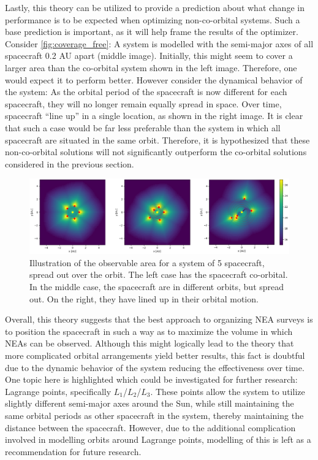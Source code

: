 Lastly, this theory can be utilized to provide a prediction about what change in performance is to be expected when optimizing non-co-orbital systems. Such a base prediction is important, as it will help frame the results of the optimizer.  Consider \autoref{fig:coverage_free}: A system is modelled with the semi-major axes of all spacecraft 0.2 AU apart (middle image). Initially, this might seem to cover a larger area than the co-orbital system shown in the left image. Therefore, one would expect it to perform better. However consider the dynamical behavior of the system: As the orbital period of the spacecraft is now different for each spacecraft, they will no longer remain equally spread in space. Over time, spacecraft ``line up'' in a single location, as shown in the right image. It is clear that such a case would be far less preferable than the system in which all spacecraft are situated in the same orbit. Therefore, it is hypothesized that these non-co-orbital solutions will not significantly outperform the co-orbital solutions considered in the previous section.\\

\begin{figure}[htbp]
 \centering
 \includegraphics[width=1.0\textwidth]{img/coverage_free.png}
 \caption{Illustration of the observable area for a system of 5 spacecraft, spread out over the orbit. The left case has the spacecraft co-orbital. In the middle case, the spacecraft are in different orbits, but spread out. On the right, they have lined up in their orbital motion.}
 \label{fig:coverage_free}
\end{figure}

Overall, this theory suggests that the best approach to organizing NEA surveys is to position the spacecraft in such a way as to maximize the volume in which NEAs can be observed. Although this might logically lead to the theory that more complicated orbital arrangements yield better results, this fact is doubtful due to the dynamic behavior of the system reducing the effectiveness over time. One topic here is highlighted which could be investigated for further research: Lagrange points, specifically $L_1$/$L_2$/$L_3$. These points allow the system to utilize slightly different semi-major axes around the Sun, while still maintaining the same orbital periods as other spacecraft in the system, thereby maintaining the distance between the spacecraft. However, due to the additional complication involved in modelling orbits around Lagrange points, modelling of this is left as a recommendation for future research.

